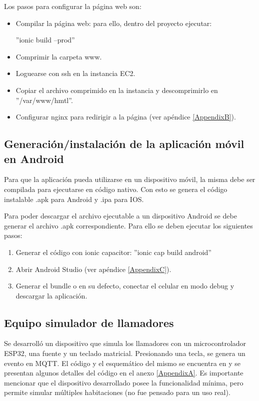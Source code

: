 Los pasos para configurar la página web son:
\begin{itemize}
\item Compilar la página web: para ello, dentro del proyecto ejecutar:

''ionic build --prod''
\item Comprimir la carpeta www.
\item Loguearse con ssh en la instancia EC2.
\item Copiar el archivo comprimido en la instancia y descomprimirlo en ''/var/www/hmtl''.
\item Configurar nginx para redirigir a la página (ver apéndice \ref{AppendixB}).

\end{itemize}

\subsection{Generación/instalación de la aplicación móvil en Android}

Para que la aplicación pueda utilizarse en un dispositivo móvil, la misma debe ser compilada para ejecutarse en código nativo. Con esto se genera el código instalable .apk para Android y .ipa para IOS. 

Para poder descargar el archivo ejecutable a un dispositivo Android se debe generar el archivo .apk correspondiente. Para ello se deben ejecutar los siguientes pasos:

\begin{enumerate}

\item Generar el código con ionic capacitor:
''ionic cap build android''
\item Abrir Android Studio (ver apéndice \ref{AppendixC}).
\item Generar el bundle o en su defecto, conectar el celular en modo debug y descargar la aplicación. 
\end{enumerate}
\pagebreak


\subsection{Equipo simulador de llamadores}

Se desarrolló un dispositivo que simula los llamadores con un microcontrolador ESP32, una fuente y un teclado matricial. Presionando una tecla, se genera un evento en MQTT. El código y el esquemático del mismo se encuentra en \citep{WEBSITE:33} y se presentan algunos detalles del código en el anexo \ref{AppendixA}. Es importante mencionar que el dispositivo desarrollado posee la funcionalidad mínima, pero permite simular múltiples habitaciones (no fue pensado para un uso real).

